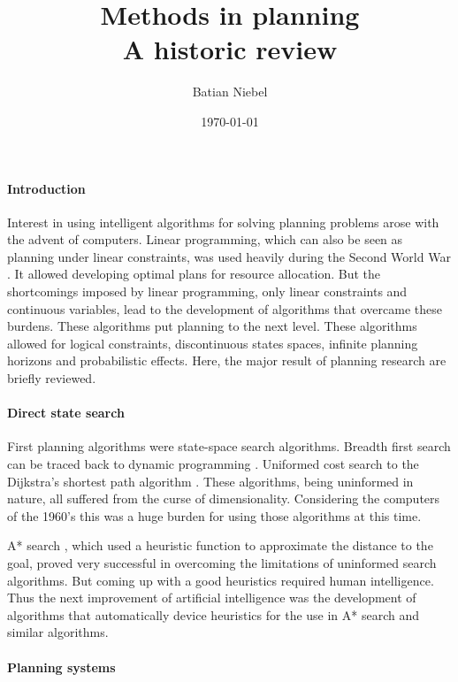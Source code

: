 \documentclass{article}
\begin{document}
\title{Methods in planning  \\ A historic review}
\author{Batian Niebel}
\date{\today}

\maketitle

\paragraph*{Introduction}

Interest in using intelligent algorithms for solving planning problems arose
with the advent of computers. Linear programming, which can also be seen as
planning under linear constraints, was used heavily during the Second World War
\cite{linearprog}. It allowed developing optimal plans for resource allocation.
But the shortcomings imposed by linear programming, only linear
constraints and continuous variables, lead to the development of
algorithms that overcame these burdens. These algorithms put planning to the
next level. These algorithms allowed for logical constraints,
discontinuous states spaces, infinite planning horizons and probabilistic
effects. Here, the major result of planning research are briefly reviewed.

\paragraph*{Direct state search}

First planning algorithms were state-space search algorithms. Breadth first
search can be traced back to dynamic programming \cite{bellman}. Uniformed cost
search to the Dijkstra's shortest path algorithm \cite{dijkstra}. These
algorithms, being uninformed in nature, all suffered from the curse of
dimensionality. Considering the computers of the 1960's this was a huge burden
for using those algorithms at this time.

A* search \cite{a_star}, which used a heuristic function to approximate the
distance to the goal, proved very successful in overcoming the limitations of 
uninformed search algorithms. But coming up with a good heuristics required
human intelligence. Thus the next improvement of artificial intelligence was the
development of algorithms that automatically device heuristics for the use in
A* search and similar algorithms.

\paragraph*{Planning systems}
\end{document}
